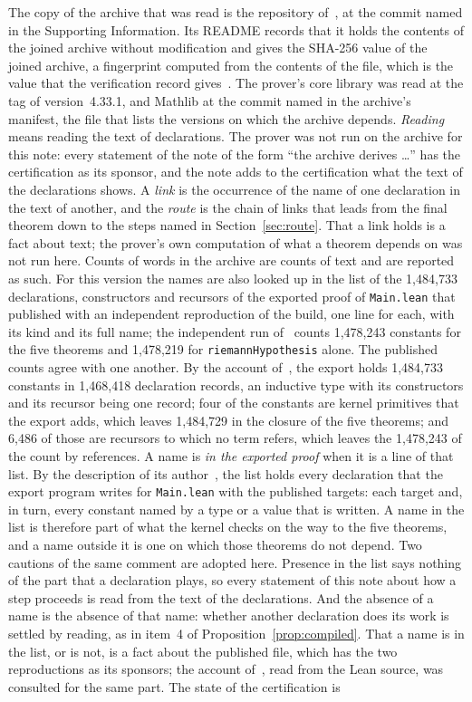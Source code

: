 \documentclass[11pt]{article}
\theoremstyle{definition}
\theoremstyle{remark}
\DeclareRobustCommand{\lean}[1]{{\renewcommand{\_}{\textunderscore\allowbreak}\texttt{#1}}}
\begin{document}
The copy of the archive that was read is the repository of~\citet{mirror}, at the commit named in the Supporting Information. Its README records that it holds the contents of the joined archive without modification and gives the SHA-256 value of the joined archive, a fingerprint computed from the contents of the file, which is the value that the verification record gives~\citep{sutherland}. The prover's core library was read at the tag of version~4.33.1, and Mathlib at the commit named in the archive's manifest, the file that lists the versions on which the archive depends. \emph{Reading} means reading the text of declarations. The prover was not run on the archive for this note: every statement of the note of the form ``the archive derives \dots'' has the certification as its sponsor, and the note adds to the certification what the text of the declarations shows. A \emph{link} is the occurrence of the name of one declaration in the text of another, and the \emph{route} is the chain of links that leads from the final theorem down to the steps named in Section~\ref{sec:route}. That a link holds is a fact about text; the prover's own computation of what a theorem depends on was not run here. Counts of words in the archive are counts of text and are reported as such. For this version the names are also looked up in the list of the 1{,}484{,}733 declarations, constructors and recursors of the exported proof of \lean{Main.lean} that~\citet{dixit} published with an independent reproduction of the build, one line for each, with its kind and its full name; the independent run of~\citet{lipponen} counts 1{,}478{,}243 constants for the five theorems and 1{,}478{,}219 for \lean{riemannHypothesis} alone. The published counts agree with one another. By the account of~\citet{shore}, the export holds 1{,}484{,}733 constants in 1{,}468{,}418 declaration records, an inductive type with its constructors and its recursor being one record; four of the constants are kernel primitives that the export adds, which leaves 1{,}484{,}729 in the closure of the five theorems; and 6{,}486 of those are recursors to which no term refers, which leaves the 1{,}478{,}243 of the count by references. A name is \emph{in the exported proof} when it is a line of that list. By the description of its author~\citep{dixitcomment}, the list holds every declaration that the export program writes for \lean{Main.lean} with the published targets: each target and, in turn, every constant named by a type or a value that is written. A name in the list is therefore part of what the kernel checks on the way to the five theorems, and a name outside it is one on which those theorems do not depend. Two cautions of the same comment are adopted here. Presence in the list says nothing of the part that a declaration plays, so every statement of this note about how a step proceeds is read from the text of the declarations. And the absence of a name is the absence of that name: whether another declaration does its work is settled by reading, as in item~4 of Proposition~\ref{prop:compiled}. That a name is in the list, or is not, is a fact about the published file, which has the two reproductions as its sponsors; the account of~\citet{vincit}, read from the Lean source, was consulted for the same part. The state of the certification is 
\end{document}
